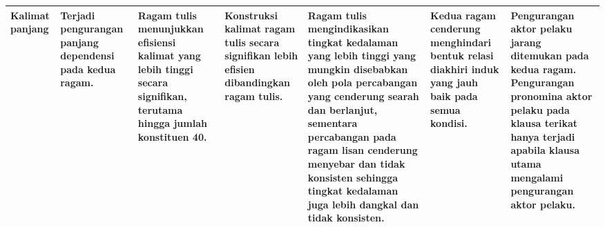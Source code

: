 \begin{landscape}
\begin{table}[htbp]
\begin{scriptsize}
\begin{center}
\begin{tabular}{| p{1.3cm} | p{2.4cm} | p{2.5cm} | p{3.5cm} | p{3.5cm} | p{3cm} | p{3cm} | }
Kalimat panjang & Terjadi pengurangan panjang dependensi pada kedua ragam. & Ragam tulis menunjukkan efisiensi kalimat yang lebih tinggi secara signifikan, terutama hingga jumlah konstituen 40. & Konstruksi kalimat ragam tulis secara signifikan lebih efisien dibandingkan ragam tulis. & Ragam tulis mengindikasikan tingkat kedalaman yang lebih tinggi yang mungkin disebabkan oleh pola percabangan yang cenderung searah dan berlanjut, sementara percabangan pada ragam lisan cenderung menyebar dan tidak konsisten sehingga tingkat kedalaman juga lebih dangkal dan tidak konsisten. & Kedua ragam cenderung menghindari bentuk relasi diakhiri induk yang jauh baik pada semua kondisi. & Pengurangan aktor pelaku jarang ditemukan pada kedua ragam. Pengurangan pronomina aktor pelaku pada klausa terikat hanya terjadi apabila klausa utama mengalami pengurangan aktor pelaku. \\ \hline

\end{tabular}
\end{center}
\end{scriptsize}
\end{table} 
\end{landscape}


